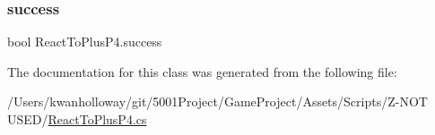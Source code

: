 \subsubsection{\texorpdfstring{success}{success}}
{\footnotesize\ttfamily bool React\+To\+Plus\+P4.\+success}



The documentation for this class was generated from the following file\+:\begin{DoxyCompactItemize}
\item 
/\+Users/kwanholloway/git/5001\+Project/\+Game\+Project/\+Assets/\+Scripts/\+Z-\/\+N\+O\+T U\+S\+E\+D/\hyperlink{_react_to_plus_p4_8cs}{React\+To\+Plus\+P4.\+cs}\end{DoxyCompactItemize}

